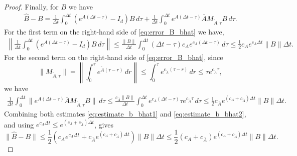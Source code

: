 \documentclass[a4paper, 10pt, english, reqno]{amsart}
\begin{document}
\begin{proof}
Finally, for $B$ we have
\begin{align}\label{eq:error_B_bhat}
        \hat B-B
    =
    \frac1{\Delta t}\int_0^{\Delta t}
    (e^{A(\Delta t-\tau)}-I_d)B\,d\tau
    +
    \frac1{\Delta t}\int_0^{\Delta t}
    e^{A(\Delta t-\tau)}\bar A M_{\tilde A,\tau}B\,d\tau.
\end{align}
For the first term on the right-hand side of \eqref{eq:error_B_bhat} we have,
\begin{align}\label{eq:estimate_b_bhat1}
     \left\|
    \frac1{\Delta t}\int_0^{\Delta t}
    (e^{A(\Delta t-\tau)}-I_d)B\,d\tau
    \right\|
    \le
    \frac{\|B\|}{\Delta t}\int_0^{\Delta t}
    (\Delta t-\tau)c_Ae^{c_A(\Delta t-\tau)}\,d\tau
    \le
    \frac12 c_A e^{c_A\Delta t}\|B\|\Delta t.
\end{align}
For the second term on the right-hand side of \eqref{eq:error_B_bhat}, since
\[
    \|M_{\tilde A,\tau}\|
    =
    \left\|
        \int_0^\tau e^{\tilde A(\tau-r)}\,dr
    \right\|
    \le
    \int_0^\tau e^{c_{\tilde A}(\tau-r)}\,dr
    \le
    \tau e^{c_{\tilde A}\tau},
\]
we have
\begin{align}\label{eq:estimate_b_bhat2}
    \frac1{\Delta t}\int_0^{\Delta t}
    \|e^{A(\Delta t-\tau)}\bar A M_{\tilde A,\tau}B\|\,d\tau
    \le
    \frac{c_{\bar A}\|B\|}{\Delta t}
    \int_0^{\Delta t}
    e^{c_A(\Delta t-\tau)}\tau e^{c_{\tilde A}\tau}\,d\tau
    \le
    \frac12 c_{\bar A}e^{(c_A+c_{\tilde A})\Delta t}\|B\|\Delta t.
\end{align}
Combining both estimates \eqref{eq:estimate_b_bhat1} and \eqref{eq:estimate_b_bhat2}, and using $e^{c_A\Delta t}\le e^{(c_A+c_{\tilde A})\Delta t}$, gives
\[
    \|\hat B-B\|
    \le
    \frac12
    \left(
        c_A e^{c_A\Delta t}
        +
        c_{\bar A}e^{(c_A+c_{\tilde A})\Delta t}
    \right)
    \|B\|\Delta t\leq \frac12
    (c_A+c_{\bar A})e^{(c_A+c_{\tilde A})\Delta t}
    \|B\|\Delta t.
\]
\end{proof}
\end{document}
